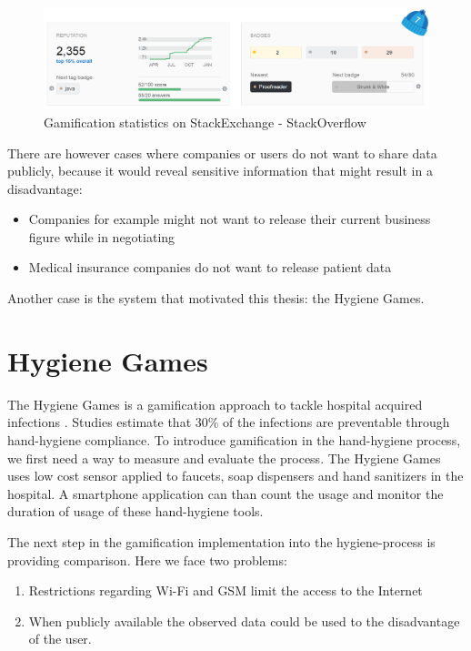 \begin{figure}[!htb] %
	\caption[StackExchange - StackOverflow]{Gamification statistics on StackExchange - StackOverflow} \label{figure:StackOverflow}
	\includegraphics[scale=1.0]{figures/stackoverflow.png}
\end{figure}

There are however cases where companies or users do not want to share data publicly, because it would reveal sensitive information that might result in a disadvantage:
\begin{itemize}
	\item Companies for example might not want to release their current business figure while in negotiating
	\item Medical insurance companies do not want to release patient data
\end{itemize}

Another case is the system that motivated this thesis: the Hygiene Games.

\section{Hygiene Games} \label{Hygiene Games}

The Hygiene Games is a gamification approach to tackle hospital acquired infections \autocite{Klein2016}. Studies estimate that 30\% of the infections are preventable through hand-hygiene compliance. To introduce gamification in the hand-hygiene process, we first need a way to measure and evaluate the process. The Hygiene Games uses low cost sensor applied to faucets, soap dispensers and hand sanitizers in the hospital. A smartphone application can than count the usage and monitor the duration of usage of these hand-hygiene tools.

The next step in the gamification implementation into the hygiene-process is providing comparison. Here we face two problems:
\begin{enumerate}
	\item Restrictions regarding Wi-Fi and \gls{GSM} limit the access to the Internet
	\item When publicly available the observed data could be used to the disadvantage of the user.
\end{enumerate}

